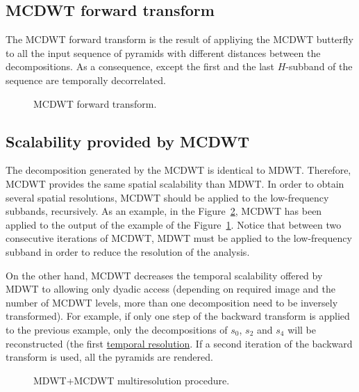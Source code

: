 \subsection{MCDWT forward transform}

The MCDWT forward transform is the result of appliying the MCDWT
butterfly to all the input sequence of pyramids with different
distances between the decompositions. As a consequence, except the
first and the last $H$-subband of the sequence are temporally
decorrelated.

\begin{figure}
\centering
{}
\caption{MCDWT forward transform.\label{fig:forward_MCDWT}}
\end{figure}


\subsection{Scalability provided by MCDWT}
The decomposition generated by the MCDWT is identical to
MDWT. Therefore, MCDWT provides the same spatial scalability than
MDWT. In order to obtain several spatial resolutions, MCDWT should be
applied to the low-frequency subbands, recursively. As an example, in
the Figure~\ref{fig:multiresolution}, MCDWT has been applied to the
output of the example of the Figure~\ref{fig:forward_MCDWT}. Notice
that between two consecutive iterations of MCDWT, MDWT must be applied
to the low-frequency subband in order to reduce the resolution of the
analysis.

On the other hand, MCDWT decreases the temporal scalability offered by
MDWT to allowing only dyadic access (depending on required image and
the number of MCDWT levels, more than one decomposition need to be
inversely transformed). For example, if only one step of the backward
transform is applied to the previous example, only the decompositions
of $s_0$, $s_2$ and $s_4$ will be reconstructed (the first
\href{https://en.wikipedia.org/wiki/Temporal_resolution}{temporal
  resolution}. If a second iteration of the backward transform is
used, all the pyramids are rendered.

\begin{figure}
\centering
{}
\caption{MDWT+MCDWT multiresolution procedure.\label{fig:multiresolution}}
\end{figure}

